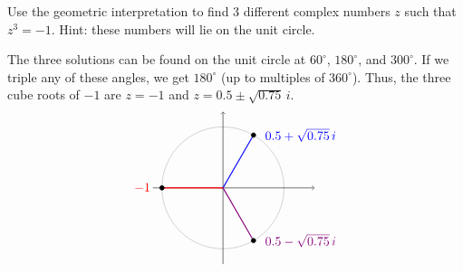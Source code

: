 \begin{enumialphparenastyle}
\begin{ex}
  Use the geometric interpretation to find 3 different complex numbers
  $z$ such that $z^3 = -1$. Hint: these numbers will lie on the unit
  circle.
  \begin{sol}
    The three solutions can be found on the unit circle at
    $60^{\circ}$, $180^{\circ}$, and $300^{\circ}$. If we triple any
    of these angles, we get $180^{\circ}$ (up to multiples of $360^{\circ}$).
    Thus, the three cube roots of $-1$ are $z=-1$ and $z=0.5\pm\sqrt{0.75}\,i$.
    \begin{equation*}
      \begin{tikzpicture}[scale=1.7]
        \draw[black!30] (0,0) circle (1);
        \draw[->](-1.15,0) -- (1.5,0);
        \draw[->](0,-1.25) -- (0,1.25);
        \draw[thick, blue] (0,0) -- (60:1);
        \draw[thick, red] (0,0) -- (180:1);
        \draw[thick, purple!70!blue] (0,0) -- (300:1);
        \draw[fill, black] (60:1) circle [radius=1.06pt] node [right=2mm,blue] {$0.5+\sqrt{0.75}\,i$};
        \draw[fill, black] (180:1) circle [radius=1.06pt] node [left=2mm,red] {$-1$};
        \draw[fill, black] (300:1) circle [radius=1.06pt] node [right=2mm,purple!70!blue] {$0.5-\sqrt{0.75}\,i$};
      \end{tikzpicture}
    \end{equation*}
  \end{sol}
\end{ex}

\end{enumialphparenastyle}
